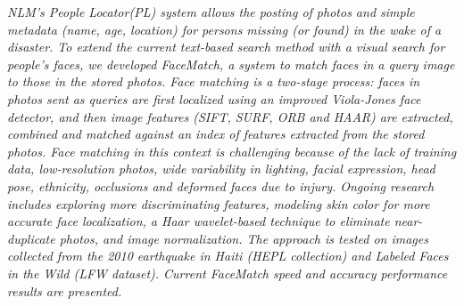 
\begin{xpsectionbox}{}{}

\emph{\color{blue} NLM's People Locator\texttrademark (PL) system allows the posting of photos and simple metadata (name, age, location) for persons missing (or found) in the wake of a disaster. To extend the current text-based search method with a visual search for people's faces, we developed FaceMatch, a system to match faces in a query image to those in the stored photos.
	Face matching is a two-stage process: faces in photos sent as queries are first localized using an improved Viola-Jones face detector, and then image features (SIFT, SURF, ORB and HAAR) are extracted, combined and matched against an index of features extracted from the stored photos. 
Face matching in this context is challenging because of the lack of training data, low-resolution photos, wide variability in lighting, facial expression, head pose, ethnicity, occlusions and deformed faces due to injury.
	Ongoing research includes exploring more discriminating features, modeling skin color for more accurate face localization, a Haar wavelet-based technique to eliminate near-duplicate photos, and image normalization. The approach is tested on images collected from the 2010 earthquake in Haiti (HEPL collection) and Labeled Faces in the Wild (LFW dataset).
Current FaceMatch speed and accuracy performance results are presented.}

\end{xpsectionbox}


